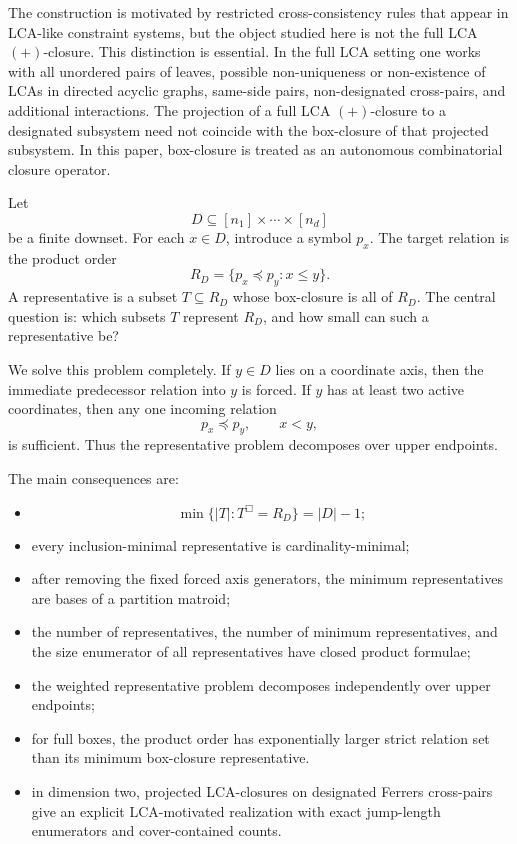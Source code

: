 \documentclass[11pt]{article}
\begin{document}
The construction is motivated by restricted cross-consistency rules that appear in LCA-like constraint systems, but the object studied here is not the full LCA $(+)$-closure. This distinction is essential. In the full LCA setting one works with all unordered pairs of leaves, possible non-uniqueness or non-existence of LCAs in directed acyclic graphs, same-side pairs, non-designated cross-pairs, and additional interactions. The projection of a full LCA $(+)$-closure to a designated subsystem need not coincide with the box-closure of that projected subsystem. In this paper, box-closure is treated as an autonomous combinatorial closure operator.

Let
\[
D\subseteq [n_1]\times\cdots\times[n_d]
\]
be a finite downset. For each $x\in D$, introduce a symbol $p_x$. The target relation is the product order
\[
R_D=\{p_x\preceq p_y:x\le y\}.
\]
A representative is a subset $T\subseteq R_D$ whose box-closure is all of $R_D$. The central question is: which subsets $T$ represent $R_D$, and how small can such a representative be?

We solve this problem completely. If $y\in D$ lies on a coordinate axis, then the immediate predecessor relation into $y$ is forced. If $y$ has at least two active coordinates, then any one incoming relation
\[
p_x\preceq p_y,\qquad x<y,
\]
is sufficient. Thus the representative problem decomposes over upper endpoints.

The main consequences are:
\begin{itemize}
\item
\[
\min\{|T|:T^\Box=R_D\}=|D|-1;
\]
\item every inclusion-minimal representative is cardinality-minimal;
\item after removing the fixed forced axis generators, the minimum representatives are bases of a partition matroid;
\item the number of representatives, the number of minimum representatives, and the size enumerator of all representatives have closed product formulae;
\item the weighted representative problem decomposes independently over upper endpoints;
\item for full boxes, the product order has exponentially larger strict relation set than its minimum box-closure representative.
\item in dimension two, projected LCA-closures on designated Ferrers cross-pairs give an explicit LCA-motivated realization with exact jump-length enumerators and cover-contained counts.
\end{itemize}
\end{document}
